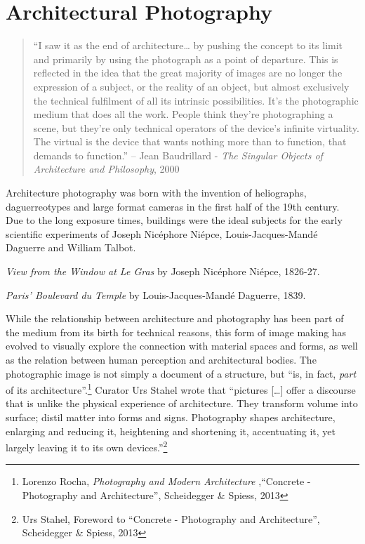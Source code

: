 \documentclass[
  openany]{book}
\begin{document}
\hypertarget{architectural-photography}{%
\chapter{Architectural Photography}\label{architectural-photography}}

\begin{quote}
``I saw it as the end of architecture\ldots{} by pushing the concept to its limit and primarily by using the photograph as a point of departure. This is reflected in the idea that the great majority of images are no longer the expression of a subject, or the reality of an object, but almost exclusively the technical fulfilment of all its intrinsic possibilities. It's the photographic medium that does all the work. People think they're photographing a scene, but they're only technical operators of the device's infinite virtuality. The virtual is the device that wants nothing more than to function, that demands to function.''
-- Jean Baudrillard - \emph{The Singular Objects of Architecture and Philosophy}, 2000
\end{quote}

Architecture photography was born with the invention of heliographs, daguerreotypes and large format cameras in the first half of the 19th century. Due to the long exposure times, buildings were the ideal subjects for the early scientific experiments of Joseph Nicéphore Niépce, Louis-Jacques-Mandé Daguerre and William Talbot.

\emph{View from the Window at Le Gras} by Joseph Nicéphore Niépce, 1826-27.

\emph{Paris' Boulevard du Temple} by Louis-Jacques-Mandé Daguerre, 1839.

While the relationship between architecture and photography has been part of the medium from its birth for technical reasons, this form of image making has evolved to visually explore the connection with material spaces and forms, as well as the relation between human perception and architectural bodies. The photographic image is not simply a document of a structure, but ``is, in fact, \emph{part} of its architecture''.\footnote{Lorenzo Rocha, \emph{Photography and Modern Architecture} ,``Concrete - Photography and Architecture'', Scheidegger \& Spiess, 2013} Curator Urs Stahel wrote that ``pictures {[}\ldots{]} offer a discourse that is unlike the physical experience of architecture. They transform volume into surface; distil matter into forms and signs. Photography shapes architecture, enlarging and reducing it, heightening and shortening it, accentuating it, yet largely leaving it to its own devices.''\footnote{Urs Stahel, Foreword to ``Concrete - Photography and Architecture'', Scheidegger \& Spiess, 2013}
\end{document}
